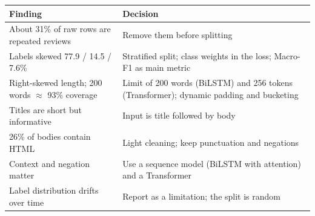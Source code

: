 \begin{center}
\begin{tabular}{@{}p{6.2cm}p{7.9cm}@{}}
    \toprule
    Finding & Decision \\
    \midrule
    About 31\% of raw rows are repeated reviews & Remove them before splitting \\
    Labels skewed 77.9 / 14.5 / 7.6\% & Stratified split; class weights in the loss; Macro-F1 as main metric \\
    Right-skewed length; 200 words $\approx$ 93\% coverage & Limit of 200 words (BiLSTM) and 256 tokens (Transformer); dynamic padding and bucketing \\
    Titles are short but informative & Input is title followed by body \\
    26\% of bodies contain HTML & Light cleaning; keep punctuation and negations \\
    Context and negation matter & Use a sequence model (BiLSTM with attention) and a Transformer \\
    Label distribution drifts over time & Report as a limitation; the split is random \\
    \bottomrule
\end{tabular}
\end{center}
